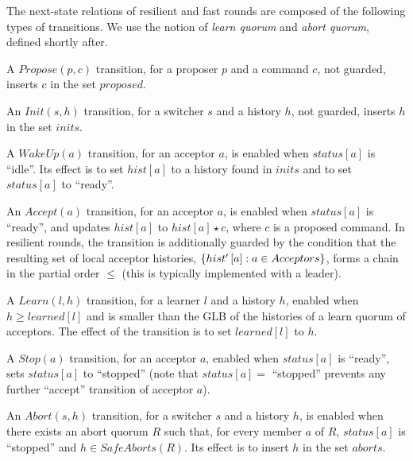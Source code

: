 \documentclass{llncs}
\begin{document}
The next-state relations of resilient and fast rounds are composed
of the following types of transitions. We use the notion of \emph{learn quorum} and \emph{abort quorum}, defined shortly after.
\begin{compactitem}
    \item A $Propose\left( p,c \right)$ transition, for a proposer $p$
        and a command $c$, not guarded, inserts $c$ in the set
        $proposed$. 
    \item An $Init\left( s, h \right)$ transition, for a switcher $s$
        and a history $h$, not guarded, inserts $h$ in the set $inits$.
    \item A $WakeUp\left( a \right)$ transition, for an acceptor $a$,
        is enabled when $status\left[ a \right]$ is ``idle''. Its
        effect is to set $hist\left[ a \right]$ to a history found in
        $inits$ and to set $status\left[ a \right]$ to ``ready''.
    \item An $Accept\left( a \right)$ transition, for an acceptor $a$,
        is enabled when $status\left[ a \right]$ is ``ready'', and
        updates $hist\left[ a \right]$ to $hist\left[ a \right]\star
        c$, where $c$ is a proposed command. In resilient rounds,
        the transition is additionally guarded by the condition that
        the resulting set of local acceptor histories,
        $\left\{hist'\left[ a \right] : a \in Acceptors\right\}$, forms a chain
        in the partial order $\leq$ (this is typically implemented with a
        leader).
    \item A $Learn\left( l, h \right)$ transition, for a learner $l$
      and a history $h$, enabled when $h \geq learned\left[ l \right]$ and is
      smaller than the GLB of the histories of a learn quorum of acceptors. The effect of
        the transition is to set $learned\left[ l \right]$ to $h$.
    \item A $Stop\left( a \right)$ transition, for an acceptor $a$,
        enabled when $status\left[ a \right]$ is ``ready'', sets
        $status\left[ a \right]$ to ``stopped'' (note that
        $status\left[ a \right] = $ ``stopped'' prevents any further
        ``accept'' transition of acceptor $a$).
    \item An $Abort\left( s, h \right)$ transition, for a switcher $s$
        and a history $h$, is enabled when there exists an abort quorum
        $R$ such that, for every member $a$ of $R$, $status\left[ a
        \right]$ is ``stopped'' and $h \in SafeAborts\left( R
        \right)$. Its effect is to insert  $h$ in the set $aborts$. 
\end{compactitem}
\end{document}
